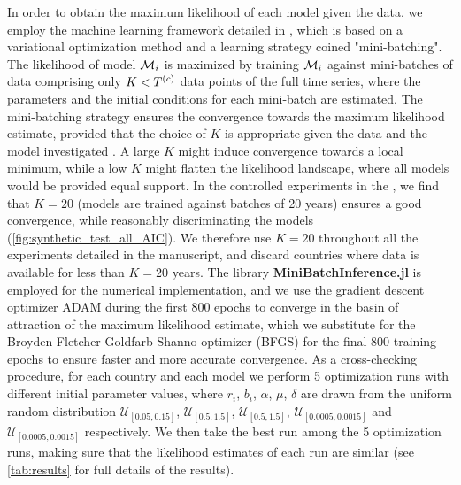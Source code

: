 In order to obtain the maximum likelihood of each model given the data, we employ the machine learning framework detailed in \cite{Boussange2022a}, which is based on a variational optimization method and a learning strategy coined "mini-batching". The likelihood of model $\mathcal{M}_i$ is maximized by training $\mathcal{M}_i$ against mini-batches of data comprising only $K < T^{(c)}$ data points of the full time series, where the parameters and the initial conditions for each mini-batch are estimated.
% 
The mini-batching strategy ensures the convergence towards the maximum likelihood estimate, provided that the choice of $K$ is appropriate given the data and the model investigated \citep{Boussange2022a}. 
% 
A large $K$ might induce convergence towards a local minimum, while a low $K$ might flatten the likelihood landscape, where all models would be provided equal support. 
% 
In the controlled experiments in the , we find that $K=20$ (models are trained against batches of 20 years) ensures a good convergence, while reasonably discriminating the models (\cref{fig:synthetic_test_all_AIC}). We therefore use $K=20$ throughout all the experiments detailed in the manuscript, and discard countries where data is available for less than $K = 20$ years.
% 
The library \textbf{MiniBatchInference.jl} \citep{Boussange2022a} is employed for the numerical implementation, and we use the gradient descent optimizer ADAM \citep{Kingma2014} during the first 800 epochs to converge in the basin of attraction of the maximum likelihood estimate, which we substitute for the Broyden-Fletcher-Goldfarb-Shanno optimizer (BFGS) \citep{fletcher2013practical} for the final 800 training epochs to ensure faster and more accurate convergence.
% 
As a cross-checking procedure, for each country and each model we perform 5 optimization runs with different initial parameter values, where $r_i$, $b_i$, $\alpha$, $\mu$, $\delta$ are drawn from the uniform random distribution $\mathcal{U}_{[0.05, 0.15]}$, $\mathcal{U}_{[0.5,1.5]}$, $\mathcal{U}_{[0.5,1.5]}$, $\mathcal{U}_{[0.0005, 0.0015]}$ and $\mathcal{U}_{[0.0005, 0.0015]}$ respectively.
% 
We then take the best run among the 5 optimization runs, making sure that the likelihood estimates of each run are similar (see \cref{tab:results} for full details of the results).
% 

